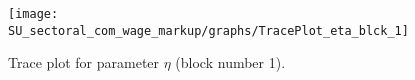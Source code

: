 \begin{figure}[H]
\centering
  \texttt{[image: SU\_sectoral\_com\_wage\_markup/graphs/TracePlot\_eta\_blck\_1]}\\
    \caption{Trace plot for parameter ${\eta}$ (block number 1).}
\end{figure}
